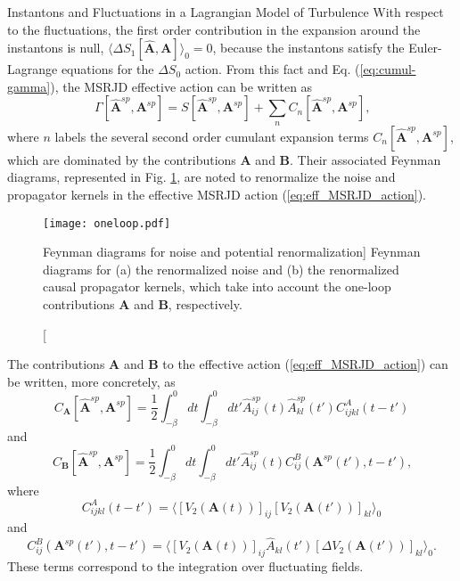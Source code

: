 \begin{chapter}{Instantons and Fluctuations in a Lagrangian Model of Turbulence}
With respect to the fluctuations, the first order contribution in the expansion around the instantons is null, $ \langle \Delta S_1 [\hat {\mathbf{A}}, {\mathbf{A}}] \rangle_0 = 0$, because the instantons satisfy the Euler-Lagrange equations for the $\Delta S_0$ action. 
From this fact and Eq. (\ref{eq:cumul-gamma}), the MSRJD effective action can be written as
\begin{equation} \label{eq:eff_MSRJD_action}
 \Gamma[\hat {\mathbf{A}}^{sp}, {\mathbf{A}}^{sp} ] = S[\hat {\mathbf{A}}^{sp}, {\mathbf{A}}^{sp} ] + \sum_n C_n [\hat {\mathbf{A}}^{sp}, {\mathbf{A}}^{sp} ] \mbox{,}
\end{equation}
where $n$ labels the several second order cumulant expansion terms $C_n [\hat {\mathbf{A}}^{sp}, {\mathbf{A}}^{sp} ]$, which are dominated by the contributions $\textbf{A}$ and $\textbf{B}$.
Their associated Feynman diagrams, represented in Fig. \ref{fig:oneloop}, are noted to renormalize the noise and propagator kernels in the effective MSRJD action (\ref{eq:eff_MSRJD_action}).
\begin{figure}[ht]
  \centering
  \texttt{[image: oneloop.pdf]}
  \caption
  [Feynman diagrams for noise and potential renormalization]
  {Feynman diagrams for (a) the renormalized noise and (b) the renormalized causal propagator kernels, which take into account the one-loop contributions {\textbf{A}} and {\textbf{B}}, respectively.}
  \label{fig:oneloop}
\end{figure}
The contributions {\textbf{A}} and {\textbf{B}} to the effective action (\ref{eq:eff_MSRJD_action}) can be written, more concretely, as
\begin{equation}\label{eq:diag_a_effective}
 C_{\textbf{A}} [\hat {\mathbf{A}}^{sp}, {\mathbf{A}}^{sp} ]  = \frac12 \int_{-\beta}^0 d t \int_{-\beta}^0 d t'
 \hat A^{sp}_{ij} (t) \hat A^{sp}_{kl} (t') C^A_{ijkl} (t-t')
\end{equation}
and
\begin{equation}\label{eq:diag_b_effective}
 C_{\textbf{B}} [\hat {\mathbf{A}}^{sp}, {\mathbf{A}}^{sp} ]  = \frac12 \int_{-\beta}^0 d t \int_{-\beta}^0 d t'
 \hat A^{sp}_{ij} (t) C^B_{ij} ({\mathbf{A}}^{sp}(t'),t-t') \mbox{,}
\end{equation}
where
\begin{equation}
    C^A_{ijkl} (t-t') = \langle [ V_2 ({\mathbf{A}}(t)) ]_{ij} [V_2 ({\mathbf{A}}(t')) ]_{kl} \rangle_0
\end{equation}
and
\begin{equation}
   C^B_{ij} ({\mathbf{A}}^{sp}(t'),t-t') = \langle [ V_2 ({\mathbf{A}}(t)) ]_{ij} \hat A_{kl} (t') [\Delta V_2 ({\mathbf{A}}(t')) ]_{kl} \rangle_0 \mbox{.}
\end{equation}
These terms correspond to the integration over fluctuating fields.


\end{chapter}
